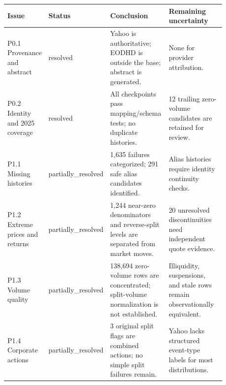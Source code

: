 \begin{tabular}{@{}p{0.16\linewidth}p{0.18\linewidth}p{0.27\linewidth}p{0.27\linewidth}@{}}
\toprule
Issue & Status & Conclusion & Remaining uncertainty \\
\midrule
P0.1 Provenance and abstract & resolved & Yahoo is authoritative; EODHD is outside the base; abstract is generated. & None for provider attribution. \\
P0.2 Identity and 2025 coverage & resolved & All checkpoints pass mapping/schema tests; no duplicate histories. & 12 trailing zero-volume candidates are retained for review. \\
P1.1 Missing histories & partially\_\allowbreak{}resolved & 1,635 failures categorized; 291 safe alias candidates identified. & Alias histories require identity continuity checks. \\
P1.2 Extreme prices and returns & partially\_\allowbreak{}resolved & 1,244 near-zero denominators and reverse-split levels are separated from market moves. & 20 unresolved discontinuities need independent quote evidence. \\
P1.3 Volume quality & partially\_\allowbreak{}resolved & 138,694 zero-volume rows are concentrated; split-volume normalization is not established. & Illiquidity, suspensions, and stale rows remain observationally equivalent. \\
P1.4 Corporate actions & partially\_\allowbreak{}resolved & 3 original split flags are combined actions; no simple split failures remain. & Yahoo lacks structured event-type labels for most distributions. \\
\bottomrule
\end{tabular}
